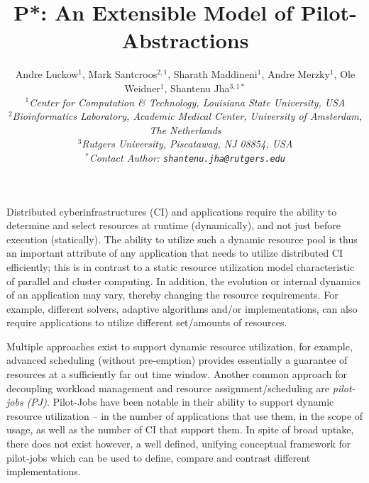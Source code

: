 \documentclass[conference,final,onecolumn]{article}
\title{P*: An Extensible Model of Pilot-Abstractions}
\date{}
\begin{document}
\ifpdf
{}
\else
{}
\fi

\author{
  Andre Luckow$^{1}$, Mark Santcroos$^{2,1}$, Sharath Maddineni$^{1}$, Andre Merzky$^{1}$,
  Ole Weidner$^{1}$, Shantenu Jha$^{3,1*}$\\
  \small{\emph{$^{1}$Center for Computation \& Technology, Louisiana State University, USA}}\\
  \small{\emph{$^{2}$Bioinformatics Laboratory, Academic Medical Center, University of Amsterdam, The Netherlands}}\\
  \small{\emph{$^{3}$Rutgers University, Piscataway, NJ 08854, USA}}\\
  \small{\emph{$^{*}$Contact Author: \texttt{shantenu.jha@rutgers.edu}}}\\
}

\maketitle
\vspace{1cm}
\thispagestyle{empty}

Distributed cyberinfrastructures (CI) and applications require the ability to
determine and select resources at runtime (dynamically), and not
just before execution (statically). The ability to utilize such a dynamic
resource pool is thus an important attribute of any application that needs to
utilize distributed CI efficiently; this is in contrast to a static resource
utilization model characteristic of parallel and cluster computing. In
addition, the evolution or internal dynamics of an application may vary,
thereby changing the resource requirements. For example, different solvers,
adaptive algorithms and/or implementations, can also require applications to
utilize different set/amounts of resources.


Multiple approaches exist to support dynamic resource utilization, for
example, advanced scheduling (without pre-emption) provides essentially a
guarantee of resources at a sufficiently far out time window. Another common
approach for decoupling workload management and resource assignment/scheduling
are \emph{pilot-jobs (PJ)}. Pilot-Jobs have been notable in their ability to
support dynamic resource utilization -- in the number of applications that use
them, in the scope of usage, as well as the number of CI that support them. In
spite of broad uptake, there does not exist however, a well defined, unifying
conceptual framework for pilot-jobs which can be used to define, compare and
contrast different implementations.
\end{document}
